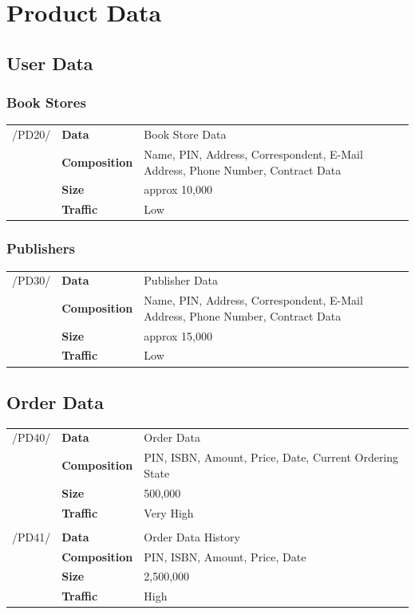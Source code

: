 \documentclass[11pt,a4paper,oneside,svgnames]{report}
\begin{document}
\chapter{Product Data}
\section{User Data}
\subsection{Book Stores}

\begin{tabular}{llp{10cm}}
\cellcolor{white}/PD20/	& \textbf{Data}			& Book Store Data\\
\cellcolor{white}		& \textbf{Composition}	& Name, PIN, Address, Correspondent, E-Mail Address, Phone Number, Contract Data\\
\cellcolor{white}		& \textbf{Size}		& approx 10,000\\
\cellcolor{white}		& \textbf{Traffic}		& Low\\
\end{tabular} 
\subsection{Publishers}
\begin{tabular}{llp{10cm}}
\cellcolor{white}/PD30/	& \textbf{Data}			& Publisher Data\\
\cellcolor{white}		& \textbf{Composition}	& Name, PIN, Address, Correspondent, E-Mail Address, Phone Number, Contract Data\\
\cellcolor{white}		& \textbf{Size}		& approx 15,000\\
\cellcolor{white}		& \textbf{Traffic}		& Low\\
\end{tabular} 
\section{Order Data}
\begin{tabular}{llp{10cm}}
\cellcolor{white}/PD40/	& \textbf{Data}			& Order Data\\
\cellcolor{white}		& \textbf{Composition}	& PIN, ISBN, Amount, Price, Date, Current Ordering State\\
\cellcolor{white}		& \textbf{Size}		& 500,000\\
\cellcolor{white}		& \textbf{Traffic}		& Very High\\
\cellcolor{white}\hfill \\
\cellcolor{white}/PD41/	& \textbf{Data}			& Order Data History\\
\cellcolor{white}		& \textbf{Composition}	& PIN, ISBN, Amount, Price, Date\\
\cellcolor{white}		& \textbf{Size}		& 2,500,000\\
\cellcolor{white}		& \textbf{Traffic}		& High\\
\end{tabular} 
\end{document}
